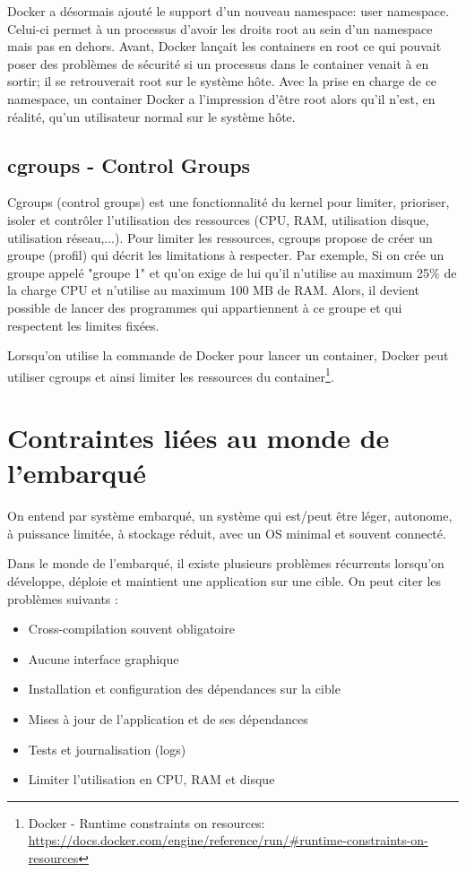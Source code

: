 Docker a désormais ajouté le support d'un nouveau namespace: user namespace. Celui-ci permet à un processus d'avoir les droits root au sein d'un namespace mais pas en dehors. Avant, Docker lançait les containers en root ce qui pouvait poser des problèmes de sécurité si un processus dans le container venait à en sortir; il se retrouverait root sur le système hôte. Avec la prise en charge de ce namespace, un container Docker a l'impression d'être root alors qu'il n'est, en réalité, qu'un utilisateur normal sur le système hôte.

\subsection{cgroups - Control Groups}
Cgroups (control groups) est une fonctionnalité du kernel pour limiter, prioriser, isoler et contrôler l'utilisation des ressources (CPU, RAM, utilisation disque, utilisation réseau,...). Pour limiter les ressources, cgroups propose de créer un groupe (profil) qui décrit les limitations à respecter. Par exemple, Si on crée un groupe appelé "groupe 1" et qu'on exige de lui qu'il n'utilise au maximum 25\% de la charge CPU et n'utilise au maximum 100 MB de RAM. Alors, il devient possible de lancer des programmes qui appartiennent à ce groupe et qui respectent les limites fixées.

Lorsqu'on utilise la commande  de Docker pour lancer un container, Docker peut utiliser cgroups et ainsi limiter les ressources du container\footnote{Docker - Runtime constraints on resources: \url{https://docs.docker.com/engine/reference/run/\#runtime-constraints-on-resources}}.

\section{Contraintes liées au monde de l'embarqué}
On entend par système embarqué, un système qui est/peut être léger, autonome, à puissance limitée, à stockage réduit, avec un OS minimal et souvent connecté.

Dans le monde de l'embarqué, il existe plusieurs problèmes récurrents lorsqu'on développe, déploie et maintient une application sur une cible. On peut citer les problèmes suivants :

\begin{itemize}
\item Cross-compilation souvent obligatoire
\item Aucune interface graphique
\item Installation et configuration des dépendances sur la cible
\item Mises à jour de l'application et de ses dépendances
\item Tests et journalisation (logs)
\item Limiter l'utilisation en CPU, RAM et disque
\end{itemize}

